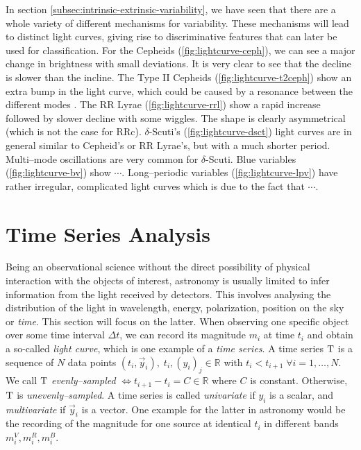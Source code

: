 
In section \ref{subsec:intrinsic-extrinsic-variability}, we have seen that there are a whole variety of different mechanisms for variability. These mechanisms will lead to distinct light curves, giving rise to discriminative features that can later be used for classification. For the Cepheids (\ref{fig:lightcurve-ceph}), we can see a major change in brightness with small deviations. It is very clear to see that the decline is slower than the incline. The Type II Cepheids (\ref{fig:lightcurve-t2ceph}) show an extra bump in the light curve, which could be caused by a resonance between the different modes \citep{caputo1999}. The RR Lyrae (\ref{fig:lightcurve-rrl}) show a rapid increase followed by slower decline with some wiggles. The shape is clearly asymmetrical (which is not the case for RRc). $\delta$-Scuti's (\ref{fig:lightcurve-dsct}) light curves are in general similar to Cepheid's or RR Lyrae's, but with a much shorter period. Multi--mode oscillations are very common for $\delta$-Scuti. Blue variables (\ref{fig:lightcurve-bv}) show $\cdots$. Long--periodic variables (\ref{fig:lightcurve-lpv}) have rather irregular, complicated light curves which is due to the fact that $\cdots$.

\section{Time Series Analysis}
\label{sec:statistical-analysis-time-series}

Being an observational science without the direct possibility of physical interaction with the objects of interest, astronomy is usually limited to infer information from the light received by detectors. This involves analysing the distribution of the light in wavelength, energy, polarization, position on the sky or \emph{time}. This section will focus on the latter. When observing one specific object over some time interval $\Delta t$, we can record its magnitude $m_i$ at time $t_i$ and obtain a so-called \emph{light curve}, which is one example of a \emph{time series}. A time series $\mathrm{T}$ is a sequence of $N$ data points $(t_i, \vec y_i),\; t_i,(y_i)_j \in \mathbb{R}$ with $t_i < t_{i+1} \; \forall i = 1,\ldots,N$. We call $\mathrm{T}$ \emph{evenly--sampled} $\Leftrightarrow t_{i+1} - t_i = C \in \mathbb{R}$ where $C$ is constant. Otherwise, $\mathrm{T}$ is \emph{unevenly--sampled}. A time series is called \emph{univariate} if $y_i$ is a scalar, and \emph{multivariate} if $\vec y_i$ is a vector. One example for the latter in astronomy would be the recording of the magnitude for one source at identical $t_i$ in different bands $m_i^{V}, m_i^{R}, m_i^{B}$.\\

